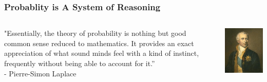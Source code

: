 \documentclass[12pt, block=fill]{beamer}
\begin{document}
\begin{frame}
  \frametitle{Probablity is A System of Reasoning}

  \begin{columns}
    \begin{column}{0.6\textwidth}
      "Essentially, the theory of probability is nothing but good common
      sense reduced to mathematics. It provides an exact appreciation of
      what sound minds feel with a kind of instinct, frequently without
      being able to account for it.”\\ 
      - Pierre-Simon Laplace
    \end{column}
    \begin{column}{0.4\textwidth}  
      \begin{center}
        \includegraphics[width=\textwidth]{figures/Laplace}
      \end{center}
    \end{column}
  \end{columns}
  

\end{frame}
\end{document}
